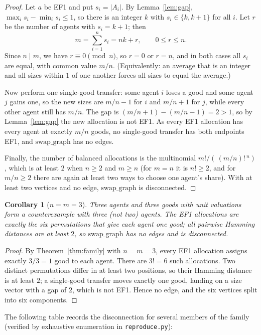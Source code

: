 \documentclass[11pt]{article}
\newtheorem{corollary}[theorem]{Corollary}
\theoremstyle{definition}
\theoremstyle{remark}
\newcommand{\swapgraph}{\mathrm{swap\_graph}}
\begin{document}
\begin{proof}
Let $a$ be EF1 and put $s_i = |A_i|$. By Lemma~\ref{lem:gap},
$\max_i s_i - \min_i s_i \le 1$, so there is an integer $k$ with
$s_i \in \{k, k+1\}$ for all $i$. Let $r$ be the number of agents with
$s_i = k+1$; then
\[
m = \sum_{i=1}^{n} s_i = nk + r, \qquad 0 \le r \le n .
\]
Since $n \mid m$, we have $r \equiv 0 \pmod n$, so $r = 0$ or $r = n$, and in
both cases all $s_i$ are equal, with common value $m/n$. (Equivalently: an
average that is an integer and all sizes within $1$ of one another forces all
sizes to equal the average.)

Now perform one single-good transfer: some agent $i$ loses a good and some agent
$j$ gains one, so the new sizes are $m/n - 1$ for $i$ and $m/n + 1$ for $j$,
while every other agent still has $m/n$. The gap is
$(m/n + 1) - (m/n - 1) = 2 > 1$, so by Lemma~\ref{lem:gap} the new allocation is
not EF1. As every EF1 allocation has every agent at exactly $m/n$ goods, no
single-good transfer has both endpoints EF1, and $\swapgraph$ has no edges.

Finally, the number of balanced allocations is the multinomial
$m!/(\,(m/n)!\,^{n})$, which is at least $2$ when $n \ge 2$ and $m \ge n$
(for $m = n$ it is $n! \ge 2$, and for $m/n \ge 2$ there are again at least two
ways to choose one agent's share). With at least two vertices and no edge,
$\swapgraph$ is disconnected.
\end{proof}

\begin{corollary}[$n = m = 3$]
Three agents and three goods with unit valuations form a counterexample with
three (not two) agents. The EF1 allocations are exactly the six permutations
that give each agent one good; all pairwise Hamming distances are at least $2$,
so $\swapgraph$ has no edges and is disconnected.
\end{corollary}

\begin{proof}
By Theorem~\ref{thm:family} with $n = m = 3$, every EF1 allocation assigns
exactly $3/3 = 1$ good to each agent. There are $3! = 6$ such allocations. Two
distinct permutations differ in at least two positions, so their Hamming
distance is at least $2$; a single-good transfer moves exactly one good, landing
on a size vector with a gap of $2$, which is not EF1. Hence no edge, and the six
vertices split into six components.
\end{proof}

The following table records the disconnection for several members of the family
(verified by exhaustive enumeration in \texttt{reproduce.py}):
\end{document}
